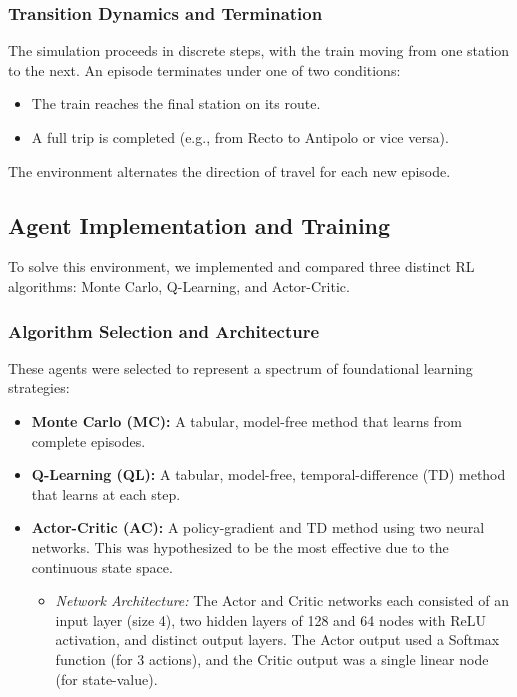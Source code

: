 \documentclass{article}
\begin{document}
\subsubsection{Transition Dynamics and Termination}

The simulation proceeds in discrete steps, with the train moving from one station to the next. An episode terminates under one of two conditions:
\begin{itemize}
    \item The train reaches the final station on its route.
    \item A full trip is completed (e.g., from Recto to Antipolo or vice versa).
\end{itemize}
The environment alternates the direction of travel for each new episode.

\subsection{Agent Implementation and Training}

To solve this environment, we implemented and compared three distinct RL algorithms: Monte Carlo, Q-Learning, and Actor-Critic.

\subsubsection{Algorithm Selection and Architecture}

These agents were selected to represent a spectrum of foundational learning strategies:
\begin{itemize}
    \item \textbf{Monte Carlo (MC):} A tabular, model-free method that learns from complete episodes.
    \item \textbf{Q-Learning (QL):} A tabular, model-free, temporal-difference (TD) method that learns at each step.
    \item \textbf{Actor-Critic (AC):} A policy-gradient and TD method using two neural networks. This was hypothesized to be the most effective due to the continuous state space.
    \begin{itemize}
        \item \textit{Network Architecture:} The Actor and Critic networks each consisted of an input layer (size 4), two hidden layers of 128 and 64 nodes with ReLU activation, and distinct output layers. The Actor output used a Softmax function (for 3 actions), and the Critic output was a single linear node (for state-value).
    \end{itemize}
\end{itemize}
\end{document}
